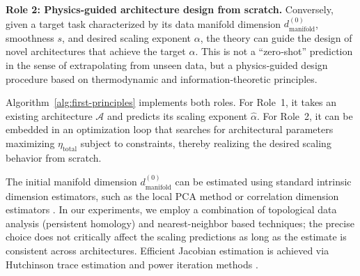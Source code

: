 \documentclass[11pt, a4paper]{article}
\theoremstyle{definition}
\begin{document}
\textbf{Role 2: Physics‑guided architecture design from scratch.} Conversely, given a target task characterized by its data manifold dimension $d_{\text{manifold}}^{(0)}$, smoothness $s$, and desired scaling exponent $\alpha$, the theory can guide the design of novel architectures that achieve the target $\alpha$. This is not a ``zero‑shot'' prediction in the sense of extrapolating from unseen data, but a physics‑guided design procedure based on thermodynamic and information‑theoretic principles.

Algorithm~\ref{alg:first-principles} implements both roles. For Role~1, it takes an existing architecture $\mathcal{A}$ and predicts its scaling exponent $\hat{\alpha}$. For Role~2, it can be embedded in an optimization loop that searches for architectural parameters maximizing $\eta_{\text{total}}$ subject to constraints, thereby realizing the desired scaling behavior from scratch.

The initial manifold dimension $d_{\text{manifold}}^{(0)}$ can be estimated using standard intrinsic dimension estimators, such as the local PCA method \cite{levina2005maximum} or correlation dimension estimators \cite{grassberger1983measuring}. In our experiments, we employ a combination of topological data analysis (persistent homology) and nearest-neighbor based techniques; the precise choice does not critically affect the scaling predictions as long as the estimate is consistent across architectures. Efficient Jacobian estimation is achieved via Hutchinson trace estimation \cite{hutchinson1990stochastic} and power iteration methods \cite{golub2013matrix}.
\end{document}
